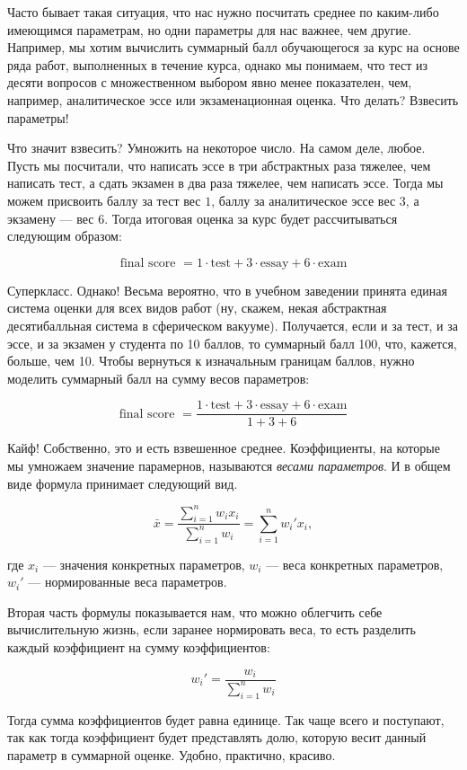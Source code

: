\documentclass[
  letterpaper,
]{scrbook}
\theoremstyle{definition}
\theoremstyle{remark}
\begin{document}
Часто бывает такая ситуация, что нас нужно посчитать среднее по
каким-либо имеющимся параметрам, но одни параметры для нас важнее, чем
другие. Например, мы хотим вычислить суммарный балл обучающегося за курс
на основе ряда работ, выполненных в течение курса, однако мы понимаем,
что тест из десяти вопросов с множественном выбором явно менее
показателен, чем, например, аналитическое эссе или экзаменационная
оценка. Что делать? Взвесить параметры!

Что значит взвесить? Умножить на некоторое число. На самом деле, любое.
Пусть мы посчитали, что написать эссе в три абстрактных раза тяжелее,
чем написать тест, а сдать экзамен в два раза тяжелее, чем написать
эссе. Тогда мы можем присвоить баллу за тест вес \(1\), баллу за
аналитическое эссе вес \(3\), а экзамену --- вес \(6\). Тогда итоговая
оценка за курс будет рассчитываться следующим образом:

\[
\text{final score } = 1 \cdot \text{test} + 3 \cdot \text{essay} + 6 \cdot \text{exam}
\]

Суперкласс. Однако! Весьма вероятно, что в учебном заведении принята
единая система оценки для всех видов работ (ну, скажем, некая
абстрактная десятибалльная система в сферическом вакууме). Получается,
если и за тест, и за эссе, и за экзамен у студента по 10 баллов, то
суммарный балл 100, что, кажется, больше, чем 10. Чтобы вернуться к
изначальным границам баллов, нужно моделить суммарный балл на сумму
весов параметров:

\[
\text{final score } = \frac{1 \cdot \text{test} + 3 \cdot \text{essay} + 6 \cdot \text{exam}}{1 + 3 + 6}
\]

Кайф! Собственно, это и есть взвешенное среднее. Коэффициенты, на
которые мы умножаем значение парамернов, называются \emph{весами
параметров}. И в общем виде формула принимает следующий вид.

\[
\bar x = \frac{\sum_{i=1}^n w_i x_i}{\sum_{i=1}^n w_i} = \sum_{i=1}^n w_i' x_i,
\]

где \(x_i\) --- значения конкретных параметров, \(w_i\) --- веса
конкретных параметров, \(w_i'\) --- нормированные веса параметров.

Вторая часть формулы показывается нам, что можно облегчить себе
вычислительную жизнь, если заранее нормировать веса, то есть разделить
каждый коэффициент на сумму коэффициентов:

\[
w_i' = \frac{w_i}{\sum_{i=1}^n w_i}
\]

Тогда сумма коэффициентов будет равна единице. Так чаще всего и
поступают, так как тогда коэффициент будет представлять долю, которую
весит данный параметр в суммарной оценке. Удобно, практично, красиво.
\end{document}
